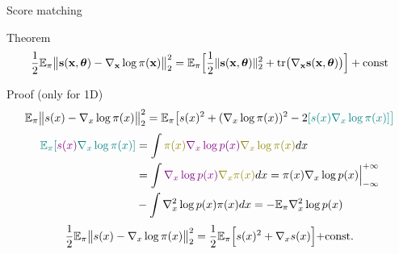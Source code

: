 \begin{frame}{Score matching}
	\begin{block}{Theorem}
		\vspace{-0.6cm}
		\[
			\frac{1}{2} \mathbb{E}_{\pi}\bigl\| \mathbf{s}(\mathbf{x}, \boldsymbol{\theta}) - \nabla_{\mathbf{x}} \log \pi(\mathbf{x}) \bigr\|^2_2 = \mathbb{E}_{\pi}\Bigr[ \frac{1}{2}\| \mathbf{s}(\mathbf{x}, \boldsymbol{\theta}) \|_2^2 + \text{tr}\bigl(\nabla_{\mathbf{x}} \mathbf{s}(\mathbf{x}, \boldsymbol{\theta})\bigr) \Bigr] + \text{const}
		\]
		\vspace{-0.6cm}
	\end{block}
	\begin{block}{Proof (only for 1D)}
		\vspace{-0.6cm}
		{\small
		\begin{multline*}
			\mathbb{E}_{\pi}\bigl\| s(x) - \nabla_x \log \pi(x) \bigr\|^2_2 = \mathbb{E}_{\pi} \bigl[ s(x)^2 + (\nabla_x \log \pi(x))^2 - 2{\color{teal}[s(x) \nabla_x \log \pi(x) ] \bigr] }
		\end{multline*}
		\vspace{-0.8cm}
		\begin{align*}
			{\color{teal}\bbE_{\pi} [{\color{violet}s(x) } \nabla_x \log \pi(x) ] } &= \int {\color{olive}\pi(x) {\color{violet}\nabla_x \log p(x)} \nabla_x \log \pi(x)} d x \\ 
			&= \int {\color{violet}\nabla_x \log p(x) } {\color{olive}\nabla_x \pi(x) } dx = \Bigl.\pi(x) \nabla_x \log p(x) \Bigr|_{-\infty}^{+\infty} \\
			&- \int \nabla^2_x \log p(x)  \pi(x) dx =- \bbE_{\pi} \nabla^2_x \log p(x)
		\end{align*}
		\[
			\frac{1}{2} \mathbb{E}_{\pi}\bigl\| s(x) - \nabla_x \log \pi(x) \bigr\|^2_2 = \frac{1}{2} \mathbb{E}_{\pi} \Bigr[s(x)^2 + \nabla_x s(x) \Bigl]+ \text{const}.
		\]
		}
	\end{block}
\end{frame}
